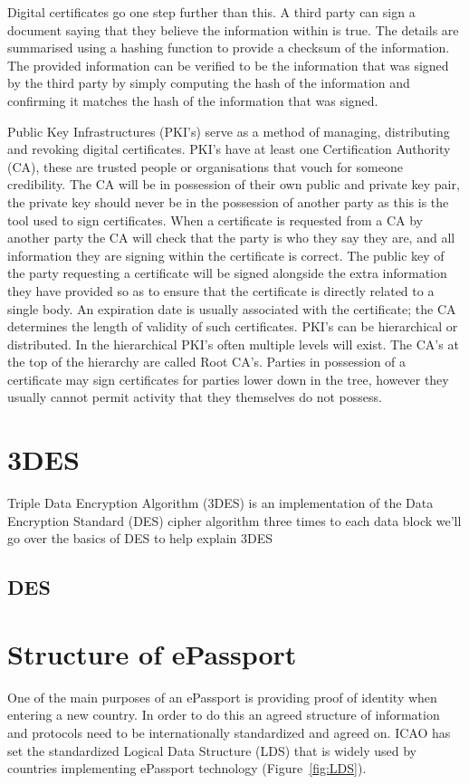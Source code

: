 \documentclass[12pt]{article}
\begin{document}
Digital certificates go one step further than this. A third party can sign a document saying that they believe the information within is true. The details are summarised using a hashing function to provide a checksum of the information. The provided information can be verified to be the information that was signed by the third party by simply computing the hash of the information and confirming it matches the hash of the information that was signed.

Public Key Infrastructures (PKI's) serve as a method of managing, distributing and revoking digital certificates. PKI's have at least one Certification Authority (CA), these are trusted people or organisations that vouch for someone credibility. The CA will be in possession of their own public and private key pair, the private key should never be in the possession of another party as this is the tool used to sign certificates. When a certificate is requested from a CA by another party the CA will check that the party is who they say they are, and all information they are signing within the certificate is correct. The public key of the party requesting a certificate will be signed alongside the extra information they have provided so as to ensure that the certificate is directly related to a single body. An expiration date is usually associated with the certificate; the CA determines the length of validity of such certificates. PKI's can be hierarchical or distributed. In the hierarchical PKI's often multiple levels will exist. The CA's at the top of the hierarchy are called Root CA's. Parties in possession of a certificate may sign certificates for parties lower down in the tree, however they usually cannot permit activity that they themselves do not possess.

\section{3DES}
\label{sec:3DES}
{\color{red}{How 3DES works and how is it so secure (not the main thing to worry about in the overall system)}}
Triple Data Encryption Algorithm (3DES) is an implementation of the Data Encryption Standard (DES) cipher algorithm three times to each data block we'll go over the basics of DES to help explain 3DES
\subsection{DES}


\section{Structure of ePassport}
\label{sec:LDS}
One of the main purposes of an ePassport is providing proof of identity when entering a new country. In order to do this an agreed structure of information and protocols need to be internationally standardized and agreed on. ICAO has set the standardized Logical Data Structure (LDS) that is widely used by countries implementing ePassport technology (Figure~\ref{fig:LDS}).
\end{document}
